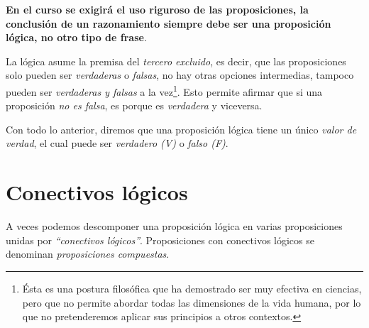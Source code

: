 \textbf{En el curso se exigirá el uso riguroso de las proposiciones, 
la conclusión de un razonamiento siempre debe ser una proposición lógica, 
no otro tipo de frase}.

La lógica asume la premisa del {\em tercero excluido}, es decir, 
que las proposiciones solo pueden ser {\em verdaderas} o {\em falsas}, 
no hay otras opciones intermedias, tampoco pueden ser {\em verdaderas y falsas} 
a la vez\footnote{\'Esta es una postura filosófica 
	que ha demostrado ser muy efectiva en ciencias, 
	pero que no permite abordar todas las dimensiones de la vida humana, 
	por lo que no pretenderemos aplicar sus principios a otros contextos.
}. 
Esto permite afirmar que si una proposición {\em no es falsa}, 
es porque es {\em verdadera} y viceversa.

Con todo lo anterior, diremos que una proposición lógica tiene un 
\'unico {\em valor de verdad}, 
el cual puede ser {\em verdadero (V)} o {\em falso (F)}.

\section{Conectivos lógicos}

A veces podemos descomponer una proposici\'on l\'ogica en 
varias proposiciones unidas por {\em ``conectivos lógicos''}.
Proposiciones con conectivos l\'ogicos
se denominan {\em proposiciones compuestas}.

\medskip

